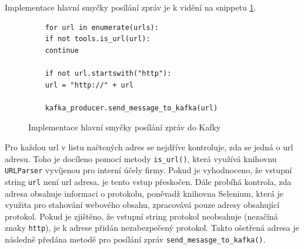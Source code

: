 \documentclass[thesis=M,czech,hidelinks]{FITthesis}[2013/05/06]
\begin{document}
Implementace hlavní smyčky posílání zpráv je k vidění na snippetu \ref{snip:kafkasendmain}. 
\begin{figure}[h]               
	\begin{verbatim}
	for url in enumerate(urls):
	if not tools.is_url(url):
	continue
	
	if not url.startswith("http"):
	url = "http://" + url
	
	kafka_producer.send_message_to_kafka(url)
	\end{verbatim}      
	\caption{Implementace hlavní smyčky posílání zpráv do Kafky}
	\label{snip:kafkasendmain}
\end{figure}
Pro každou url v listu načtených adres se nejdříve kontroluje, zda se jedná o url adresu. Toho je docíleno pomocí metody \texttt{is_url()}, která využívá knihovnu \texttt{URLParser} vyvíjenou pro interní účely firmy. Pokud je vyhodnoceno, že vstupní string \texttt{url} není url adresa, je tento vstup přeskočen. Dále probíhá kontrola, zda adresa obsahuje informaci o protokolu, poněvadž knihovna Selenium, která je využita pro stahování webového obsahu, zpracovává pouze adresy obsahující protokol. Pokud je zjištěno, že vstupní string protokol neobsahuje (nezačíná znaky \texttt{http}), je k adrese přidán nezabezpečený protokol. Takto ošetřená adresa je následně předána metodě pro posílání zpráv \texttt{send_mesasge_to_kafka()}.
\end{document}
